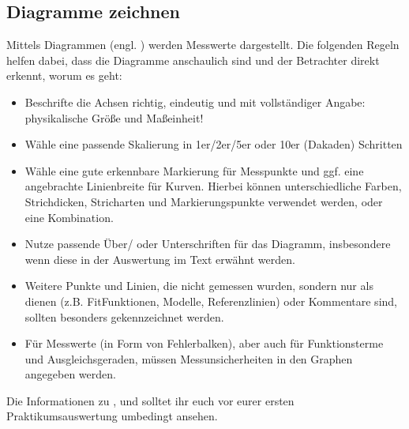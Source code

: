 \documentclass[letterpaper,10pt,english]{jupyterBook}
\begin{document}
\subsection{Diagramme zeichnen}
\label{\detokenize{content/1_Einleitung:diagramme-zeichnen}}
\sphinxAtStartPar
Mittels Diagrammen (engl. ) werden Messwerte dargestellt. Die folgenden Regeln helfen dabei, dass die Diagramme anschaulich sind und der Betrachter direkt erkennt, worum es geht:
\begin{itemize}
\item {} 
\sphinxAtStartPar
{} Beschrifte die Achsen richtig, eindeutig und mit vollständiger Angabe: physikalische Größe und Maßeinheit!

\item {} 
\sphinxAtStartPar
{} Wähle eine passende Skalierung in 1er\sphinxhyphen{}/2er\sphinxhyphen{}/5er oder 10er\sphinxhyphen{} (Dakaden) Schritten

\item {} 
\sphinxAtStartPar
{} Wähle eine gute erkennbare Markierung für Messpunkte und ggf. eine angebrachte Linienbreite für Kurven. Hierbei können unterschiedliche Farben, Strichdicken, Stricharten und Markierungspunkte verwendet werden, oder eine Kombination.

\item {} 
\sphinxAtStartPar
{} Nutze passende Über\sphinxhyphen{}/ oder Unterschriften für das Diagramm, insbesondere wenn diese in der Auswertung im Text erwähnt werden.

\item {} 
\sphinxAtStartPar
{} Weitere Punkte und Linien, die nicht gemessen wurden, sondern nur als  dienen (z.B. Fit\sphinxhyphen{}Funktionen, Modelle, Referenzlinien) oder Kommentare sind, sollten besonders gekennzeichnet werden.

\item {} 
\sphinxAtStartPar
{} Für Messwerte (in Form von Fehlerbalken), aber auch für Funktionsterme und Ausgleichsgeraden, müssen Messunsicherheiten in den Graphen angegeben werden.

\end{itemize}


\nopagebreak


\sphinxAtStartPar
Die Informationen zu {\hyperref[\detokenize{content/1_Messunsicherheiten::doc}]{}}, {\hyperref[\detokenize{content/1_Mittelwert_StdAbw::doc}]{}} und {\hyperref[\detokenize{content/1_Fehlerfortpflanzung::doc}]{}} solltet ihr euch vor eurer ersten Praktikumsauswertung umbedingt ansehen.
\end{document}
